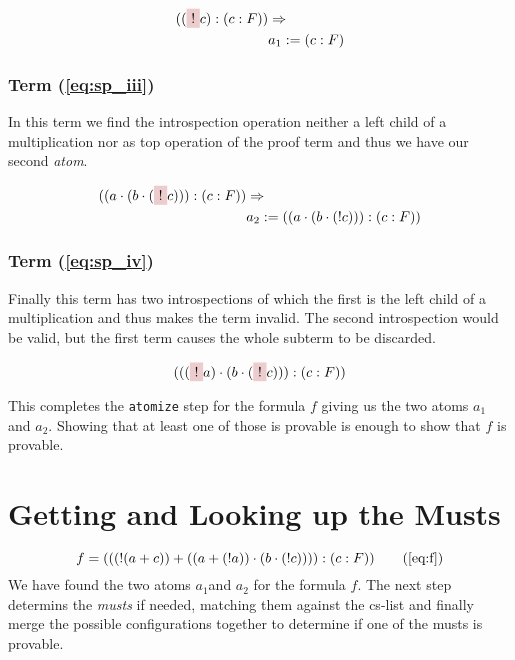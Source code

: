 \begin{equation}\label{eq:a_1}
	\begin{split}
	((\tikz[baseline]{\node[fill=red!20,anchor=base] (t1){$!$};} c):(c:F)) & \Rightarrow \\
	& a_1 := (c:F)
	\end{split}
\end{equation}

\subsubsection[Third term]{Term (\ref{eq:sp_iii})}
In this term we find the introspection operation neither a left child of a multiplication nor as top operation of the proof term and thus we have our second \emph{atom}.

\begin{equation}\label{eq:a_2}
	\begin{split}
	((a \cdot(b\cdot (\tikz[baseline]{\node[fill=red!20,anchor=base] (t1){$!$};} c))):(c:F))	 & \Rightarrow \\
	& a_2 := ((a \cdot(b\cdot (! c))):(c:F))
	\end{split}
\end{equation}

\subsubsection[Fourths term]{Term (\ref{eq:sp_iv})}
Finally this term has two introspections of which the first is the left child of a multiplication and thus makes the term invalid. The second introspection would be valid, but the first term causes the whole subterm to be discarded.

\begin{equation*}
	(((
	\tikz[baseline]{\node[fill=red!20,anchor=base] (t1){$!$};} a)\cdot(b\cdot (
	\tikz[baseline]{\node[fill=red!20,anchor=base] (t1){$!$};} c))):(c:F))
\end{equation*}

\bigskip
This completes the \texttt{atomize} step for the formula $f$ giving us the two atoms $a_1$ and $a_2$. Showing that at least one of those is provable is enough to show that $f$ is provable. 

\section{Getting and Looking up the Musts}

\begin{equation*}
		f = (((!(a+c))+((a+(!a))\cdot(b\cdot(!c)))):(c:F)) 
		\tag{\ref{eq:f}}  
\end{equation*}
We have found the two atoms $a_1$and $a_2$ for the formula $f$. The next step determins the \emph{musts} if needed, matching them against the cs-list and finally merge the possible configurations together to determine if one of the musts is provable.


